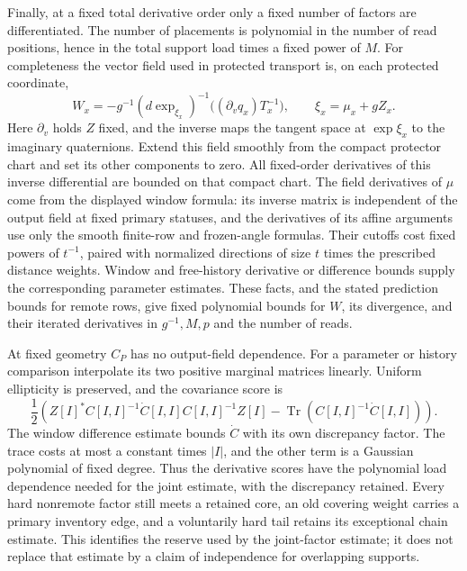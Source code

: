 Finally, at a fixed total derivative order only a fixed number of factors
are differentiated.  The number of placements is polynomial in the
number of read positions, hence in the total support load times a fixed
power of $M$.  For completeness the vector field used in protected
transport is, on each protected coordinate,
\[
 W_x=-g^{-1}(d\exp_{\xi_x})^{-1}
             \bigl((\partial_vq_x)T_x^{-1}\bigr),
 \qquad \xi_x=\mu_x+gZ_x.
\]
Here $\partial_v$ holds $Z$ fixed, and the inverse maps the tangent
space at $\exp\xi_x$ to the imaginary quaternions.  Extend this field
smoothly from the compact protector chart and set its other components
to zero.  All fixed-order derivatives of this inverse differential
are bounded on that compact chart.  The field derivatives of $\mu$
come from the displayed window formula: its inverse matrix is independent
of the output field at fixed primary statuses, and the derivatives of
its affine arguments use only the smooth finite-row and frozen-angle
formulas.  Their cutoffs cost fixed powers of $t^{-1}$, paired with
normalized directions of size $t$ times the prescribed distance weights.
Window and free-history derivative or difference bounds supply the
corresponding parameter estimates.  These facts, and the stated
prediction bounds for remote rows, give fixed polynomial bounds for
$W$, its divergence, and their iterated derivatives in $g^{-1},M,p$
and the number of reads.

At fixed geometry $C_P$ has no output-field dependence.  For a parameter
or history comparison interpolate its two positive marginal matrices
linearly.  Uniform ellipticity is preserved, and the covariance score is
\[
 \frac12\left(Z[I]^*C[I,I]^{-1}\dot C[I,I]
                   C[I,I]^{-1}Z[I]
             -\operatorname{Tr}(C[I,I]^{-1}\dot C[I,I])\right).
\]
The window difference estimate bounds $\dot C$ with its own discrepancy
factor.  The trace costs at most a constant times $|I|$, and the other
term is a Gaussian polynomial of fixed degree.  Thus the derivative
scores have the polynomial load dependence needed for the joint
estimate, with the discrepancy retained.  Every hard nonremote factor still meets a retained
core, an old covering weight carries a primary inventory edge, and a
voluntarily hard tail retains its exceptional chain estimate.  This
identifies the reserve used by the joint-factor estimate; it does not
replace that estimate by a claim of independence for overlapping
supports.
